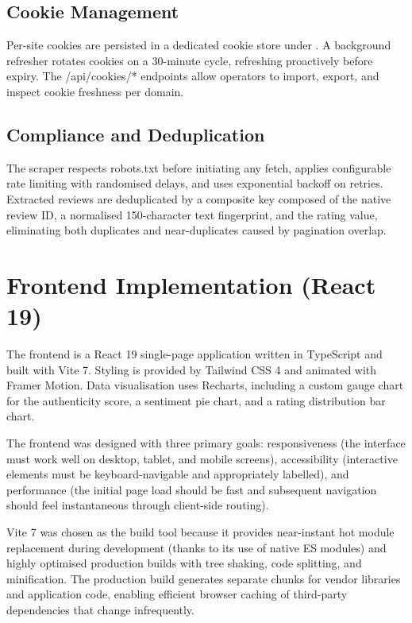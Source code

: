 \documentclass[12pt,a4paper,oneside]{report}
\renewcommand{\texttt}[1]{%
  {\ttfamily\hyphenchar\font=45\relax #1}}
\begin{document}
\subsection{Cookie Management}
Per-site cookies are persisted in a dedicated cookie store under
. A background refresher rotates cookies
on a 30-minute cycle, refreshing proactively before expiry. The
\texttt{/api/cookies/*} endpoints allow operators to import, export,
and inspect cookie freshness per domain.

\subsection{Compliance and Deduplication}
The scraper respects \texttt{robots.txt} before initiating any fetch,
applies configurable rate limiting with randomised delays, and uses
exponential backoff on retries. Extracted reviews are deduplicated by
a composite key composed of the native review ID, a normalised
150-character text fingerprint, and the rating value, eliminating both
duplicates and near-duplicates caused by pagination overlap.

\section{Frontend Implementation (React 19)}
The frontend is a React 19 single-page application written in
TypeScript and built with Vite 7. Styling is provided by Tailwind CSS
4 and animated with Framer Motion. Data visualisation uses Recharts,
including a custom gauge chart for the authenticity score, a
sentiment pie chart, and a rating distribution bar chart.

The frontend was designed with three primary goals: responsiveness
(the interface must work well on desktop, tablet, and mobile screens),
accessibility (interactive elements must be keyboard-navigable and
appropriately labelled), and performance (the initial page load should
be fast and subsequent navigation should feel instantaneous through
client-side routing).

Vite 7 was chosen as the build tool because it provides near-instant
hot module replacement during development (thanks to its use of native
ES modules) and highly optimised production builds with tree shaking,
code splitting, and minification. The production build generates
separate chunks for vendor libraries and application code, enabling
efficient browser caching of third-party dependencies that change
infrequently.
\end{document}
